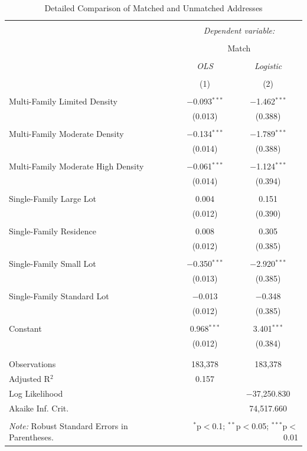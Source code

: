\documentclass[11pt]{article}
\begin{document}
\begin{table}[!htbp] \centering 
  \caption{Detailed Comparison of Matched and Unmatched Addresses} 
  \label{tab:geocode_match_categorical} 
\begin{tabular}{@{\extracolsep{5pt}}lcc} 
\\[-1.8ex]\hline 
\hline \\[-1.8ex] 
 & \multicolumn{2}{c}{\textit{Dependent variable:}} \\ 
\cline{2-3} 
\\[-1.8ex] & \multicolumn{2}{c}{Match} \\ 
\\[-1.8ex] & \textit{OLS} & \textit{Logistic} \\ 
\\[-1.8ex] & (1) & (2)\\ 
\hline \\[-1.8ex] 
 Multi-Family Limited Density & $-$0.093$^{***}$ & $-$1.462$^{***}$ \\ 
  & (0.013) & (0.388) \\ 
  & & \\ 
 Multi-Family Moderate Density & $-$0.134$^{***}$ & $-$1.789$^{***}$ \\ 
  & (0.014) & (0.388) \\ 
  & & \\ 
 Multi-Family Moderate High Density & $-$0.061$^{***}$ & $-$1.124$^{***}$ \\ 
  & (0.014) & (0.394) \\ 
  & & \\ 
 Single-Family Large Lot & 0.004 & 0.151 \\ 
  & (0.012) & (0.390) \\ 
  & & \\ 
 Single-Family Residence & 0.008 & 0.305 \\ 
  & (0.012) & (0.385) \\ 
  & & \\ 
 Single-Family Small Lot & $-$0.350$^{***}$ & $-$2.920$^{***}$ \\ 
  & (0.013) & (0.385) \\ 
  & & \\ 
 Single-Family Standard Lot & $-$0.013 & $-$0.348 \\ 
  & (0.012) & (0.385) \\ 
  & & \\ 
 Constant & 0.968$^{***}$ & 3.401$^{***}$ \\ 
  & (0.012) & (0.384) \\ 
  & & \\ 
\hline \\[-1.8ex] 
Observations & 183,378 & 183,378 \\ 
Adjusted R$^{2}$ & 0.157 &  \\ 
Log Likelihood &  & $-$37,250.830 \\ 
Akaike Inf. Crit. &  & 74,517.660 \\ 
\hline 
\hline \\[-1.8ex] 
\textit{Note:} Robust Standard Errors in Parentheses.  & \multicolumn{2}{r}{$^{*}$p$<$0.1; $^{**}$p$<$0.05; $^{***}$p$<$0.01} \\ 
\end{tabular} 
\end{table} 
\end{document}
